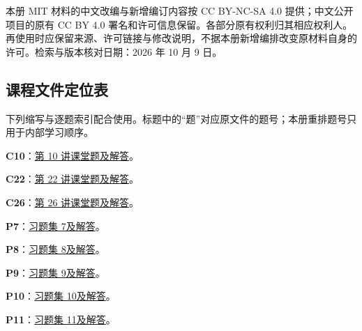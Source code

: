\documentclass[UTF8,12pt,a4paper,fontset=fandol]{ctexart}
\begin{document}
本册 MIT 材料的中文改编与新增编订内容按 CC BY-NC-SA 4.0 提供；中文公开项目的原有 CC BY 4.0 署名和许可信息保留。各部分原有权利归其相应权利人。再使用时应保留来源、许可链接与修改说明，不据本册新增编排改变原材料自身的许可。检索与版本核对日期：2026 年 10 月 9 日。

\subsection*{课程文件定位表}
下列缩写与逐题索引配合使用。标题中的“题”对应原文件的题号；本册重排题号只用于内部学习顺序。


\noindent\textbf{C10}：\href{https://ocw.mit.edu/courses/18-05-introduction-to-probability-and-statistics-spring-2022/mit18_05_s22_class10_pset_sol.pdf}{第 10 讲课堂题及解答}。\par

\noindent\textbf{C22}：\href{https://ocw.mit.edu/courses/18-05-introduction-to-probability-and-statistics-spring-2022/mit18_05_s22_class22_pset_sol.pdf}{第 22 讲课堂题及解答}。\par

\noindent\textbf{C26}：\href{https://ocw.mit.edu/courses/18-05-introduction-to-probability-and-statistics-spring-2022/mit18_05_s22_class26_pset_sol.pdf}{第 26 讲课堂题及解答}。\par

\noindent\textbf{P7}：\href{https://ocw.mit.edu/courses/18-05-introduction-to-probability-and-statistics-spring-2022/mit18_05_s22_pset07_sol.pdf}{习题集 7及解答}。\par

\noindent\textbf{P8}：\href{https://ocw.mit.edu/courses/18-05-introduction-to-probability-and-statistics-spring-2022/mit18_05_s22_pset08_sol.pdf}{习题集 8及解答}。\par

\noindent\textbf{P9}：\href{https://ocw.mit.edu/courses/18-05-introduction-to-probability-and-statistics-spring-2022/mit18_05_s22_pset09_sol.pdf}{习题集 9及解答}。\par

\noindent\textbf{P10}：\href{https://ocw.mit.edu/courses/18-05-introduction-to-probability-and-statistics-spring-2022/mit18_05_s22_pset10_sol.pdf}{习题集 10及解答}。\par

\noindent\textbf{P11}：\href{https://ocw.mit.edu/courses/18-05-introduction-to-probability-and-statistics-spring-2022/mit18_05_s22_pset11_sol.pdf}{习题集 11及解答}。\par
\end{document}

